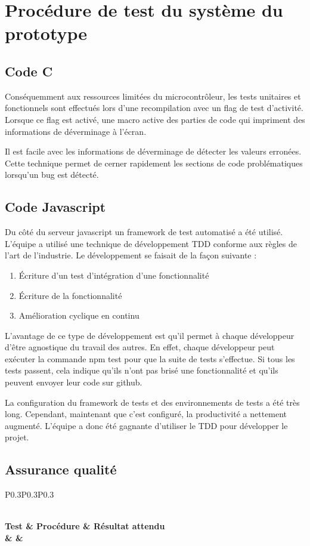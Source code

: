\section{Procédure de test du système du prototype}
	\subsection{Code C}
	Conséquemment aux ressources limitées du microcontrôleur, les tests unitaires et fonctionnels sont effectués lors d’une recompilation avec un \og flag\fg{} de test d'activité. Lorsque ce \og flag\fg{} est activé, une macro active des parties de code qui impriment des informations de déverminage à l’écran.

	Il est facile avec les informations de déverminage de détecter les valeurs erronées. Cette technique permet de cerner rapidement les sections de code problématiques lorsqu’un bug est détecté.

	\subsection{Code Javascript}
	Du côté du serveur javascript un \og framework\fg{} de test automatisé a été utilisé. L’équipe a utilisé une technique de développement TDD conforme aux règles de l’art de l’industrie. Le développement se faisait de la façon suivante : 
	\begin{enumerate}
		\item Écriture d’un test d’intégration d’une fonctionnalité
		\item Écriture de la fonctionnalité
		\item Amélioration cyclique en continu
	\end{enumerate}%
	
	L’avantage de ce type de développement est qu’il permet à chaque développeur d’être agnostique du travail des autres. En effet, chaque développeur peut exécuter la commande \og npm test \fg{} pour que la suite de tests s’effectue. Si tous les tests passent, cela indique qu’ils n’ont pas brisé une fonctionnalité et qu’ils peuvent envoyer leur code sur github. %

	La configuration du \og framework\fg{} de tests et des environnements de tests a été très long. Cependant, maintenant que c’est configuré, la productivité a nettement augmenté. L’équipe a donc été gagnante d’utiliser le TDD pour développer le projet.
		
	\subsection{Assurance qualité}
	\begin{longtable}[c]{P{0.3\textwidth}P{0.3\textwidth}P{0.3\textwidth}}
		\caption{Plan de test du prototype} \\
		\hline
		\bf Test & \bf Procédure & \bf Résultat attendu \\
		\hline
		\hline
		{\Test & \Procedure & \ResultatAttendu}
		\\\hline
	\end{longtable}
